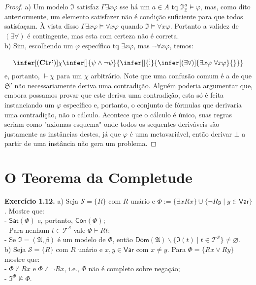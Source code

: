 \documentclass[11pt]{article}
\newcommand{\mc}[1]{\mathcal{#1}}
\newcommand{\mf}[1]{\mathfrak{#1}}
\newcommand{\msf}[1]{\mathsf{#1}}
\begin{document}
\begin{proof}
    a) Um modelo $\mf{I}$ satisfaz $\Gamma\exists x\varphi$ sse há um $a\in A$ tq $\mf{I}\frac{a}{x}\vDash\varphi$, mas, como dito anteriormente, um elemento satisfazer não é condição suficiente para que todos satisfaçam. À vista disso $\Gamma\exists x\varphi\vDash\forall x\varphi$ quando $\mf{I}\vDash\forall x\varphi$. Portanto a validez de $(\exists\forall)$ é contingente, mas esta com certeza não é correta.\\
    b) Sim, escolhendo um $\varphi$ específico tq $\exists x\varphi$, mas $\neg\forall x\varphi$, temos:
    $$\infer[(\textbf{Ctr'})]{\chi}{\infer[]{\psi\wedge\neg\psi}{\infer[]{\vdots}{\infer[(\exists\forall)]{\exists x\varphi~\forall x\varphi}{}}}}$$
    e, portanto, $\vdash\chi$ para um $\chi$ arbitrário. Note que uma confusão comum é a de que $\mf{S}'$ não necessariamente deriva uma contradição. Alguém poderia argumentar que, embora possamos provar que este deriva uma contradição, esta só é feita instanciando um $\varphi$ específico e, portanto, o conjunto de fórmulas que derivaria uma contradição, não o cálculo. Acontece que o cálculo é único, suas regras seriam como "axiomas esquema" onde todos os sequentes deriváveis são justamente as instâncias destes, já que $\varphi$ é uma metavariável, então derivar $\bot$ a partir de uma instância não gera um problema.
\end{proof}

\section{O Teorema da Completude}

\begin{shaded}
\textbf{Exercício 1.12.} a) Seja $\mc{S}=\{R\}$ com $R$ unário e $\Phi:=\{\exists xRx\}\cup\{\neg Ry\mid y\in\msf{Var}\}$. Mostre que:\\
- $\msf{Sat}(\Phi)$ e, portanto, $\msf{Con}(\Phi)$;\\
- Para nenhum $t\in\mc{T}^\mc{S}$ vale $\Phi\vdash Rt$;\\
- Se $\mf{I}=(\mf{A},\beta)$ é um modelo de $\Phi$, então $\msf{Dom}(\mf{A})\backslash\{\mf{I}(t)\mid t\in\mc{T}^\mc{S}\}\ne\varnothing$.\\
b) Seja $\mc{S}=\{R\}$ com $R$ unário e $x,y\in\msf{Var}$ com $x\ne y$. Para $\Phi=\{Rx\vee Ry\}$ mostre que:\\
- $\Phi\nvdash Rx$ e $\Phi\nvdash\neg Rx$, i.e., $\Phi$ não é completo sobre negação;\\
- $\mf{I}^\Phi\nvDash\Phi$.\\
\end{shaded}
\end{document}
